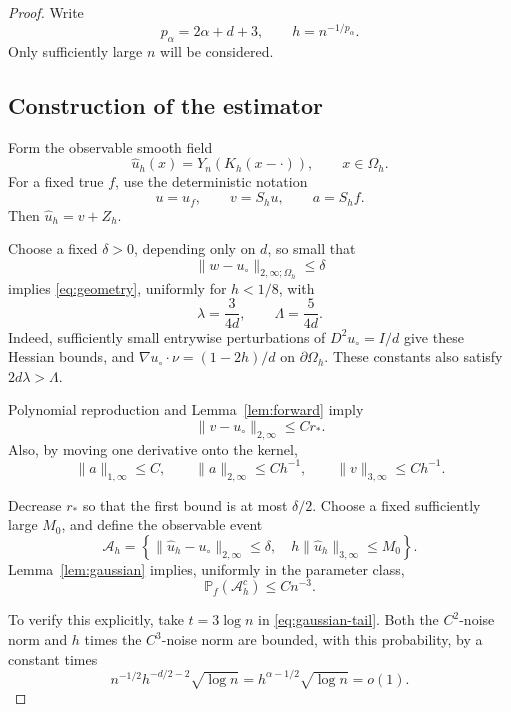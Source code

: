 \documentclass[11pt]{article}
\theoremstyle{remark}
\newcommand{\Prob}{\mathbb P}
\begin{document}
\begin{proof}
Write
\[
p_\alpha=2\alpha+d+3,\qquad h=n^{-1/p_\alpha}.
\]
Only sufficiently large \(n\) will be considered.

\subsection*{Construction of the estimator}

Form the observable smooth field
\[
\widehat u_h(x)=Y_n(K_h(x-\cdot)),\qquad x\in\Omega_h.
\]
For a fixed true \(f\), use the deterministic notation
\[
u=u_f,\qquad v=S_hu,\qquad a=S_hf.
\]
Then \(\widehat u_h=v+Z_h\).

Choose a fixed \(\delta>0\), depending only on \(d\), so small that
\[
\|w-u_\circ\|_{2,\infty;\Omega_h}\leq\delta
\]
implies \eqref{eq:geometry}, uniformly for \(h<1/8\), with
\[
\lambda=\frac{3}{4d},\qquad
\Lambda=\frac{5}{4d}.
\]
Indeed, sufficiently small entrywise perturbations of \(D^2u_\circ=I/d\)
give these Hessian bounds, and
\(\nabla u_\circ\cdot\nu=(1-2h)/d\) on \(\partial\Omega_h\).
These constants also satisfy \(2d\lambda>\Lambda\).

Polynomial reproduction and Lemma~\ref{lem:forward} imply
\[
\|v-u_\circ\|_{2,\infty}\leq Cr_*.
\]
Also, by moving one derivative onto the kernel,
\[
\|a\|_{1,\infty}\leq C,\qquad
\|a\|_{2,\infty}\leq Ch^{-1},\qquad
\|v\|_{3,\infty}\leq Ch^{-1}.
\]

Decrease \(r_*\) so that the first bound is at most \(\delta/2\).
Choose a fixed sufficiently large \(M_0\), and define the observable
event
\[
\mathcal A_h=
\left\{
\|\widehat u_h-u_\circ\|_{2,\infty}\leq\delta,\quad
h\|\widehat u_h\|_{3,\infty}\leq M_0
\right\}.
\]
Lemma~\ref{lem:gaussian} implies, uniformly in the parameter class,
\begin{equation}\label{eq:good-event}
\Prob_f(\mathcal A_h^c)\leq Cn^{-3}.
\end{equation}


To verify this explicitly, take \(t=3\log n\) in
\eqref{eq:gaussian-tail}. Both the \(C^2\)-noise norm and \(h\)
times the \(C^3\)-noise norm are bounded, with this probability,
by a constant times
\[
n^{-1/2}h^{-d/2-2}\sqrt{\log n}
=h^{\alpha-1/2}\sqrt{\log n}=o(1).
\]


\end{proof}
\end{document}
